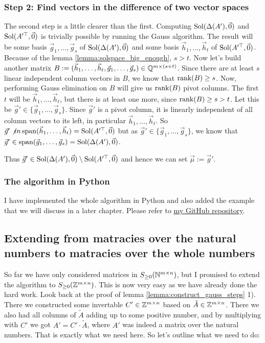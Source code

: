 \subsubsection{Step 2: Find vectors in the difference of two vector spaces}
The second step is a little clearer than the first. Computing $\operatorname{Sol}(\Delta(A'), \vec0)$ and $\operatorname{Sol}(A'^\top, \vec0)$ is trivially possible by running the Gauss algorithm. The result will be some basis $\vec g_{1}, \dots, \vec g_s$ of $\operatorname{Sol}(\Delta(A'), \vec0)$ and some basis $\vec h_1, \dots, \vec h_t$ of $\operatorname{Sol}(A'^\top, \vec0)$. Because of the lemma \ref{lemma:solspace_big_enough}, $s > t$. Now let's build another matrix $B := (\vec h_1, \dots, \vec h_t, \vec g_{1}, \dots, \vec g_s) \in \mathbb{Q}^{m\times(s+t)}$. Since there are at least $s$ linear independent column vectors in $B$, we know that $\operatorname{rank}(B)\geq s$. Now, performing Gauss elimination on $B$ will give us $\operatorname{rank}(B)$ pivot columns. The first $t$ will be $\vec h_1, \dots, \vec h_t$, but there is at least one more, since $\operatorname{rank}(B)\geq s > t$. Let this be $\vec g' \in \{\vec g_{1}, \dots, \vec g_s\}$. Since $\vec g'$ is a pivot column, it is linearly independent of all column vectors to its left, in particular $\vec h_1, \dots, \vec h_t$. So $\vec g' \not in \operatorname{span}(\vec h_1, \dots, \vec h_t) = \operatorname{Sol}(A'^\top, \vec0)$ but as $\vec g' \in \{\vec g_{1}, \dots, \vec g_s\}$, we know that $\vec g' \in \operatorname{span}(\vec g_{1}, \dots, \vec g_s) = \operatorname{Sol}(\Delta(A'), \vec0)$.

Thus $\vec g' \in \operatorname{Sol}(\Delta(A'), \vec0)\setminus\operatorname{Sol}(A'^\top, \vec0)$ and hence we can set $\vec\mu := \vec g'$.

\subsubsection{The algorithm in Python}
I have implemented the whole algorithm in Python and also added the example that we will discuss in a later chapter. Please refer to \href{https://github.com/Mioriarty/bachelor-thesis/tree/master/code/paper_code}{my GitHub repository}.

\subsection{Extending from matracies over the natural numbers to matracies over the whole numbers}
So far we have only considered matrices in $S_{\geq 0}(\mathbb{N}^{m \times n})$, but I promised to extend the algorithm to $S_{\geq 0}(\mathbb{Z}^{m \times n})$. This is now very easy as we have already done the hard work. Look back at the proof of lemma \ref{lemma:construct_gauss_steps} 1). There we constructed some invertable $C'\in\mathbb{Z}^{m \times n}$ based on $\tilde A \in \mathbb{Z}^{m \times n}$. There we also had all columns of $\tilde A$ adding up to some positive number, and by multiplying with $C'$ we got $A' = C' \cdot \tilde A$, where $A'$ was indeed a matrix over the natural numbers. That is exactly what we need here. So let's outline what we need to do:

